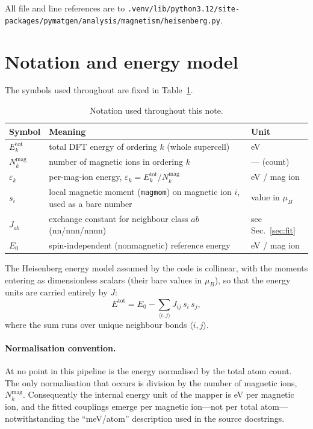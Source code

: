 \documentclass[11pt]{article}
\newcommand{\code}[1]{\texttt{\def\_{\textunderscore\allowbreak}#1}}
\begin{document}
\noindent
All file and line references are to
\code{.venv/\allowbreak lib/\allowbreak python3.12/\allowbreak site-packages/\allowbreak pymatgen/\allowbreak analysis/\allowbreak magnetism/\allowbreak heisenberg.py}.

\section{Notation and energy model}

The symbols used throughout are fixed in Table~\ref{tab:notation}.

\begin{table}[h]
\centering
\caption{Notation used throughout this note.}
\label{tab:notation}
\begin{tabularx}{\textwidth}{@{}l X l@{}}
\toprule
Symbol & Meaning & Unit \\
\midrule
$E_k^{\mathrm{tot}}$ & total DFT energy of ordering $k$ (whole supercell) & eV \\
$N_k^{\mathrm{mag}}$ & number of magnetic ions in ordering $k$ & --- (count) \\
$\varepsilon_k$ & per-mag-ion energy, $\varepsilon_k = E_k^{\mathrm{tot}}/N_k^{\mathrm{mag}}$ & eV / mag ion \\
$s_i$ & local magnetic moment (\code{magmom}) on magnetic ion $i$, used as a bare number & value in $\mu_B$ \\
$J_{ab}$ & exchange constant for neighbour class $ab$ (nn/nnn/nnnn) & see Sec.~\ref{sec:fit} \\
$E_0$ & spin-independent (nonmagnetic) reference energy & eV / mag ion \\
\bottomrule
\end{tabularx}
\end{table}

\noindent
The Heisenberg energy model assumed by the code is collinear, with the moments
entering as dimensionless scalars (their bare values in $\mu_B$), so that the
energy units are carried entirely by $J$:
\begin{equation}
E^{\mathrm{tot}} = E_0 - \sum_{\langle i,j\rangle} J_{ij}\, s_i\, s_j ,
\label{eq:model}
\end{equation}
where the sum runs over unique neighbour bonds $\langle i,j\rangle$.

\paragraph{Normalisation convention.}
At no point in this pipeline is the energy normalised by the total atom count.
The only normalisation that occurs is division by the number of magnetic ions,
$N_k^{\mathrm{mag}}$. Consequently the internal energy unit of the mapper is
eV per magnetic ion, and the fitted couplings emerge per magnetic ion---not per
total atom---notwithstanding the ``meV/atom'' description used in the source
docstrings.
\end{document}
